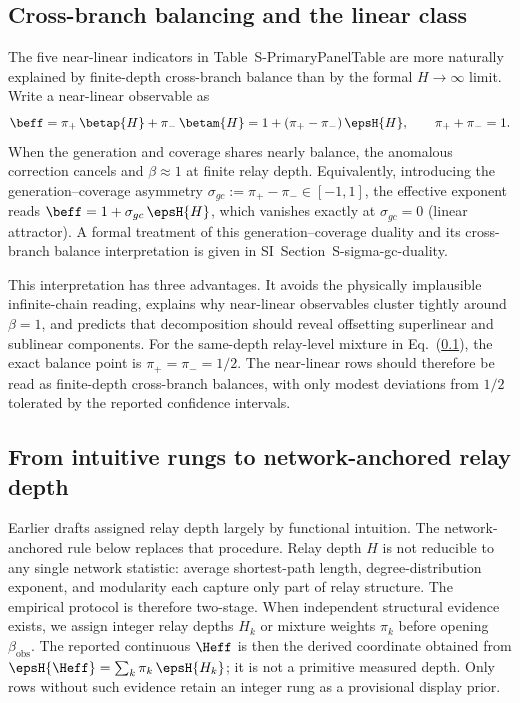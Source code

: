 \subsection{Cross-branch balancing and the linear class}
\label{subsec:cross_branch_balance}
The five near-linear indicators in Table~\textsf{S-PrimaryPanelTable} are more
naturally explained by finite-depth cross-branch balance than by the formal
$H\to\infty$ limit. Write a near-linear observable as
\begin{equation}
\beff=\pi_{+}\,\betap{H}+\pi_{-}\,\betam{H}
    =1+(\pi_{+}-\pi_{-})\,\epsH{H},
\qquad \pi_{+}+\pi_{-}=1.
\label{eq:same_depth_balance}
\end{equation}
When the generation and coverage shares nearly balance, the anomalous
correction cancels and $\beta\approx 1$ at finite relay depth.
Equivalently, introducing the generation--coverage asymmetry
$\sigma_{gc}:=\pi_{+}-\pi_{-}\in[-1,1]$, the effective exponent reads
$\beff=1+\sigma_{gc}\,\epsH{H}$, which vanishes exactly at $\sigma_{gc}=0$
(linear attractor).  A formal treatment of this generation--coverage duality
and its cross-branch balance interpretation is given in
SI~Section~\textsf{S-sigma-gc-duality}.

This interpretation has three advantages. It avoids the physically implausible
infinite-chain reading, explains why near-linear observables cluster tightly
around $\beta=1$, and predicts that decomposition should reveal offsetting
superlinear and sublinear components. For the same-depth relay-level mixture
in Eq.~(\ref{subsec:cross_branch_balance}), the exact balance point is
$\pi_{+}=\pi_{-}=1/2$. The near-linear rows should therefore be read as
finite-depth cross-branch balances, with only modest deviations from
$1/2$ tolerated by the reported confidence intervals.

\subsection{From intuitive rungs to network-anchored relay depth}\label{subsec:network_anchored_relay}
Earlier drafts assigned relay depth largely by functional intuition. The
network-anchored rule below replaces that procedure. Relay
depth $H$ is not reducible to any single network statistic: average
shortest-path length, degree-distribution exponent, and modularity each capture
only part of relay structure. The empirical protocol is therefore two-stage.
When independent structural evidence exists, we assign integer relay depths
$H_k$ or mixture weights $\pi_k$ before opening $\beta_{\mathrm{obs}}$.
The reported continuous $\Heff$ is then the derived coordinate obtained from
$\epsH{\Heff}=\sum_k \pi_k\,\epsH{H_k}$; it is not a primitive measured depth.
Only rows without such evidence retain an integer rung as a provisional display prior.


